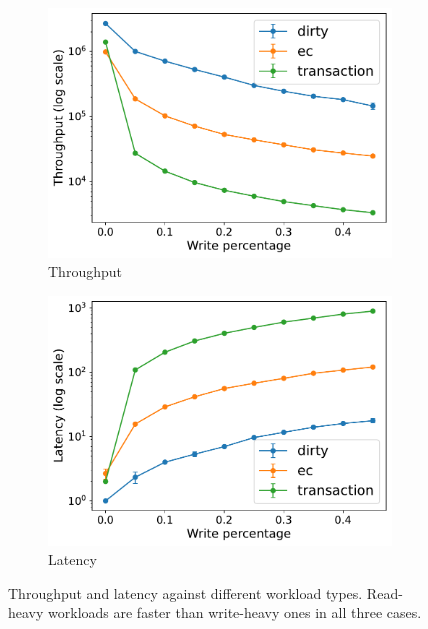 \begin{figure}[htp]
  \centering
  \begin{subfigure}[t]{0.95\columnwidth}
    \centering
    \includegraphics[width=\columnwidth]{figures/tp_rw_caelum.pdf}
    \caption{Throughput}
    \label{fig:tp workload caelum}
  \end{subfigure}
  
  \begin{subfigure}[t]{0.95\columnwidth}
    \centering
    \includegraphics[width=\columnwidth]{figures/lat_rw_caelum.pdf}
    \caption{Latency}
    \label{fig:lat workload caelum}
  \end{subfigure}
  \caption{Throughput and latency against different workload types. Read-heavy
  workloads are faster than write-heavy ones in all three cases.}
  \label{fig:workload caelum}
\end{figure}

